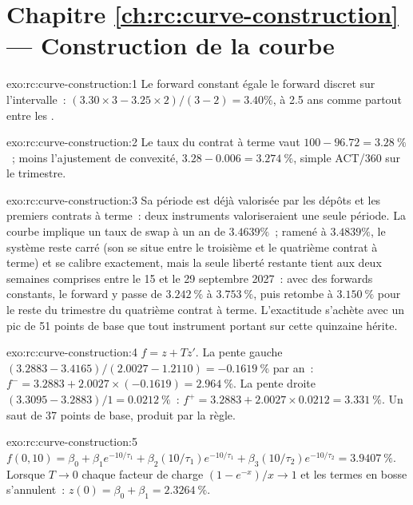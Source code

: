 \section*{Chapitre \ref{ch:rc:curve-construction} --- Construction de la courbe}

\begin{solution}{exo:rc:curve-construction:1}
Le forward constant égale le forward discret sur l'intervalle~: $(3.30\times3 -
3.25\times2)/(3-2) = 3.40\%$, à 2.5 ans comme partout entre les .
\end{solution}

\begin{solution}{exo:rc:curve-construction:2}
Le taux du contrat à terme vaut $100-96.72 = 3.28~\%$~; moins l'ajustement de convexité,
$3.28-0.006 = 3.274~\%$, simple ACT/360 sur le trimestre.
\end{solution}

\begin{solution}{exo:rc:curve-construction:3}
Sa période est déjà valorisée par les dépôts et les premiers contrats à terme~: deux
instruments valoriseraient une seule période. La courbe implique un taux de swap à un an de
$3.4639\%$~; ramené à $3.4839\%$, le système reste carré (son  se situe
entre le troisième et le quatrième contrat à terme) et se calibre exactement, mais la
seule liberté restante tient aux deux semaines comprises entre le 15 et le 29 septembre 2027~:
avec des forwards constants, le forward y passe de $3.242~\%$ à $3.753~\%$, puis
retombe à $3.150~\%$ pour le reste du trimestre du quatrième contrat à terme. L'exactitude s'achète
avec un pic de 51 points de base que tout instrument portant sur cette quinzaine hérite.
\end{solution}

\begin{solution}{exo:rc:curve-construction:4}
$f = z + Tz'$. La pente gauche $(3.2883-3.4165)/(2.0027-1.2110) = -0.1619~\%$ par an~:
$f^- = 3.2883 + 2.0027\times(-0.1619) = 2.964~\%$. La pente droite
$(3.3095-3.2883)/1 = 0.0212~\%$~: $f^+ = 3.2883+2.0027\times0.0212 = 3.331~\%$. Un
saut de 37 points de base, produit par la règle.
\end{solution}

\begin{solution}{exo:rc:curve-construction:5}
$f(0,10) = \beta_0 + \beta_1e^{-10/\tau_1} + \beta_2(10/\tau_1)e^{-10/\tau_1} +
\beta_3(10/\tau_2)e^{-10/\tau_2} = 3.9407~\%$. Lorsque $T\to0$ chaque facteur de charge
$(1-e^{-x})/x\to1$ et les termes en bosse s'annulent~: $z(0)=\beta_0+\beta_1 =
2.3264~\%$.
\end{solution}

